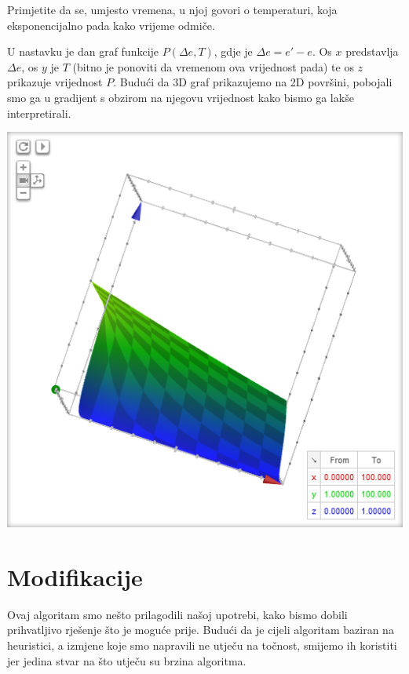 \documentclass[times, utf8, zavrsni]{fer}
\begin{document}
Primjetite da se, umjesto vremena, u njoj govori o temperaturi,
koja eksponencijalno pada kako vrijeme odmiče. 

U nastavku je dan graf funkcije $P(\Delta e, T)$, gdje je $\Delta e = e'-e$. Os
$x$ predstavlja $\Delta e$, os $y$ je $T$ (bitno je ponoviti da
vremenom ova vrijednost pada) te os $z$ prikazuje vrijednost $P$. 
Budući da 3D graf prikazujemo na 2D površini, pobojali smo ga
u gradijent s obzirom na njegovu vrijednost kako bismo ga lakše 
interpretirali. 

\includegraphics{res/P_graf_de(0_100)_t(1,100).PNG}

\section{Modifikacije}

Ovaj algoritam smo nešto prilagodili našoj upotrebi, kako bismo dobili
prihvatljivo rješenje što je moguće prije. Budući da je cijeli
algoritam baziran na heuristici, a izmjene koje smo napravili
ne utječu na točnost, smijemo ih koristiti jer jedina stvar
na što utječu su brzina algoritma. 
\end{document}
